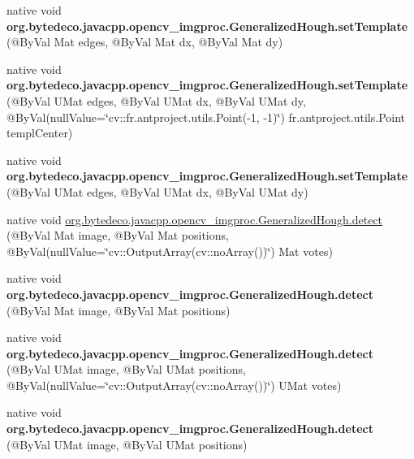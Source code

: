 \begin{DoxyCompactItemize}
\item 
\mbox{\label{group__imgproc_gaee66bb5449f1696593b72ddac21ee537}} 
native void {\bfseries org.\+bytedeco.\+javacpp.\+opencv\+\_\+imgproc.\+Generalized\+Hough.\+set\+Template} (@By\+Val Mat edges, @By\+Val Mat dx, @By\+Val Mat dy)
\item 
\mbox{\label{group__imgproc_ga5b84de74e671dabd19b56647c70fa6a8}} 
native void {\bfseries org.\+bytedeco.\+javacpp.\+opencv\+\_\+imgproc.\+Generalized\+Hough.\+set\+Template} (@By\+Val U\+Mat edges, @By\+Val U\+Mat dx, @By\+Val U\+Mat dy, @By\+Val(null\+Value=\char`\"{}cv\+::\+fr.antproject.utils.Point(-\/1, -\/1)\char`\"{}) fr.antproject.utils.Point templ\+Center)
\item 
\mbox{\label{group__imgproc_ga376f795b638014b6913df217287adedf}} 
native void {\bfseries org.\+bytedeco.\+javacpp.\+opencv\+\_\+imgproc.\+Generalized\+Hough.\+set\+Template} (@By\+Val U\+Mat edges, @By\+Val U\+Mat dx, @By\+Val U\+Mat dy)
\item 
native void \hyperlink{group__imgproc_ga85f8c877156761def90adf12f47cf2d7}{org.\+bytedeco.\+javacpp.\+opencv\+\_\+imgproc.\+Generalized\+Hough.\+detect} (@By\+Val Mat image, @By\+Val Mat positions, @By\+Val(null\+Value=\char`\"{}cv\+::\+Output\+Array(cv\+::no\+Array())\char`\"{}) Mat votes)
\item 
\mbox{\label{group__imgproc_gafa4cdb7109c63ea103f235711d281164}} 
native void {\bfseries org.\+bytedeco.\+javacpp.\+opencv\+\_\+imgproc.\+Generalized\+Hough.\+detect} (@By\+Val Mat image, @By\+Val Mat positions)
\item 
\mbox{\label{group__imgproc_gae6dbf10c5f3e8671c5d40d0565674c5d}} 
native void {\bfseries org.\+bytedeco.\+javacpp.\+opencv\+\_\+imgproc.\+Generalized\+Hough.\+detect} (@By\+Val U\+Mat image, @By\+Val U\+Mat positions, @By\+Val(null\+Value=\char`\"{}cv\+::\+Output\+Array(cv\+::no\+Array())\char`\"{}) U\+Mat votes)
\item 
\mbox{\label{group__imgproc_ga636e88b9b2ecb856ddc0b34682da18cb}} 
native void {\bfseries org.\+bytedeco.\+javacpp.\+opencv\+\_\+imgproc.\+Generalized\+Hough.\+detect} (@By\+Val U\+Mat image, @By\+Val U\+Mat positions)
\item 

\end{DoxyCompactItemize}
